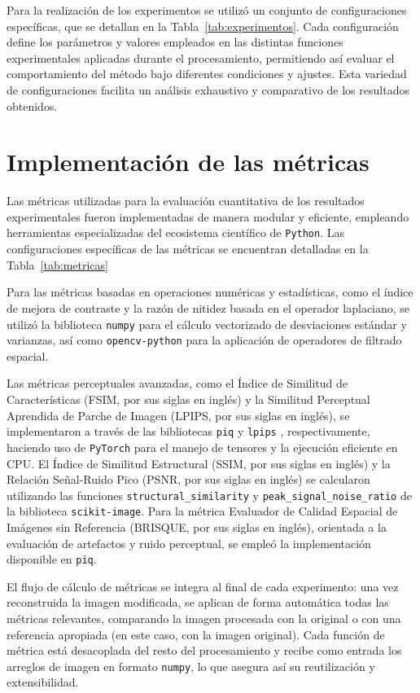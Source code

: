 Para la realización de los experimentos se utilizó un conjunto de configuraciones específicas, que se detallan en la Tabla~\ref{tab:experimentos}. Cada configuración define los parámetros y valores empleados en las distintas funciones experimentales aplicadas durante el procesamiento, permitiendo así evaluar el comportamiento del método bajo diferentes condiciones y ajustes. Esta variedad de configuraciones facilita un análisis exhaustivo y comparativo de los resultados obtenidos.

\section{Implementación de las métricas} \label{section:metrics-implementation}

Las métricas utilizadas para la evaluación cuantitativa de los resultados experimentales fueron implementadas de manera modular y eficiente, empleando herramientas especializadas del ecosistema científico de \texttt{Python}. Las configuraciones específicas de las métricas se encuentran detalladas en la Tabla~\ref{tab:metricas}

Para las métricas basadas en operaciones numéricas y estadísticas, como el índice de mejora de contraste y la razón de nitidez basada en el operador laplaciano, se utilizó la biblioteca \texttt{numpy} para el cálculo vectorizado de desviaciones estándar y varianzas, así como \texttt{opencv-python} para la aplicación de operadores de filtrado espacial.

Las métricas perceptuales avanzadas, como el Índice de Similitud de Características (FSIM, por sus siglas en inglés) y la Similitud Perceptual Aprendida de Parche de Imagen (LPIPS, por sus siglas en inglés), se implementaron a través de las bibliotecas \texttt{piq} \cite{kastryulin2022piq} y \texttt{lpips} \cite{lpips}, respectivamente, haciendo uso de \texttt{PyTorch} \cite{paszke2019pytorch} para el manejo de tensores y la ejecución eficiente en CPU. El Índice de Similitud Estructural (SSIM, por sus siglas en inglés) y la Relación Señal-Ruido Pico (PSNR, por sus siglas en inglés) se calcularon utilizando las funciones \texttt{structural\_similarity} y \texttt{peak\_signal\_noise\_ratio} de la biblioteca \texttt{scikit-image}. Para la métrica Evaluador de Calidad Espacial de Imágenes sin Referencia (BRISQUE, por sus siglas en inglés), orientada a la evaluación de artefactos y ruido perceptual, se empleó la implementación disponible en \texttt{piq}.


El flujo de cálculo de métricas se integra al final de cada experimento: una vez reconstruida la imagen modificada, se aplican de forma automática todas las métricas relevantes, comparando la imagen procesada con la original o con una referencia apropiada (en este caso, con la imagen original). Cada función de métrica está desacoplada del resto del procesamiento y recibe como entrada los arreglos de imagen en formato \texttt{numpy}, lo que asegura así su reutilización y extensibilidad.

